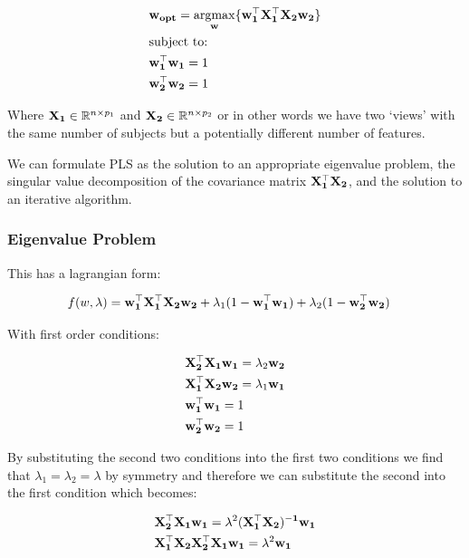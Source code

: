 \begin{align}
    & \bold{w_{opt}}=\underset{\bold{w}}{\mathrm{argmax}}\{ \bold{w_1^{\top}X_1^{\top}X_2w_2}  \}\\
    & \text{subject to:} \notag\\
    & \bold{w_1^{\top}w_1}=1 \notag\\
    & \bold{w_2^{\top}w_2}=1 \notag
\end{align}

Where $\bold{X_1} \in \mathbb{R}^{n \times p_1}$ and $\bold{X_2} \in \mathbb{R}^{n \times p_2}$ or in other words we have two `views' with the same number of subjects but a potentially different number of features.

We can formulate PLS as the solution to an appropriate eigenvalue problem, the singular value decomposition of the covariance matrix $\bold{X_1^{\top}X_2}$, and the solution to an iterative algorithm.

\subsubsection{Eigenvalue Problem}

This has a lagrangian form:

\begin{align}
    & f(w,\lambda)=\bold{w_1^{\top}X_1^{\top}X_2w_2} + \lambda_1(1-\bold{w_1^{\top}w_1}) + \lambda_2(1-\bold{w_2^{\top}w_2})
\end{align}

With first order conditions:

\begin{align}
    & \bold{X_2^{\top}X_1w_1}=\lambda_2\bold{w_2}\\
    & \bold{X_1^{\top}X_2w_2}=\lambda_1\bold{w_1}\\
    & \bold{w_1^{\top}w_1}=1\\
    & \bold{w_2^{\top}w_2}=1 
\end{align}

By substituting the second two conditions into the first two conditions we find that $\lambda_1=\lambda_2=\lambda$ by symmetry and therefore we can substitute the second into the first condition which becomes:

\begin{align}
    & \bold{X_2^{\top}X_1w_1}=\lambda^2\bold{(X_1^{\top}X_2)^{-1}w_1}\\
    & \bold{X_1^{\top}X_2X_2^{\top}X_1w_1}=\lambda^2\bold{w_1}
\end{align}

